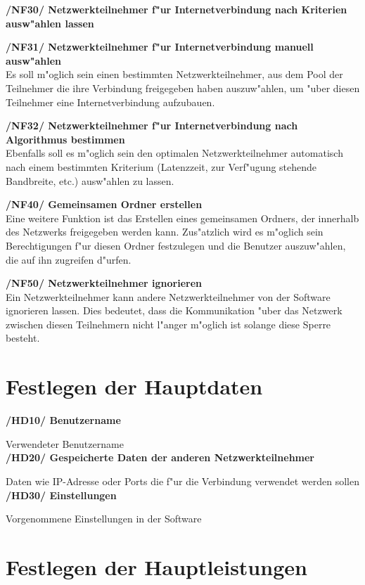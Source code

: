 \documentclass[a4paper,12pt]{scrreprt}
\begin{document}
	\textbf {/NF30/ Netzwerkteilnehmer f"ur Internetverbindung nach Kriterien ausw"ahlen lassen}
	
	\textbf {/NF31/ Netzwerkteilnehmer f"ur Internetverbindung manuell ausw"ahlen}
	\\Es soll m"oglich sein einen bestimmten Netzwerkteilnehmer, aus dem Pool der Teilnehmer die ihre Verbindung freigegeben haben auszuw"ahlen, um "uber diesen Teilnehmer eine Internetverbindung aufzubauen.
	
	\textbf {/NF32/ Netzwerkteilnehmer f"ur Internetverbindung nach Algorithmus bestimmen}
	\\Ebenfalls soll es m"oglich sein den optimalen Netzwerkteilnehmer automatisch nach einem bestimmten Kriterium (Latenzzeit, zur Verf"ugung stehende Bandbreite, etc.) ausw"ahlen zu lassen.
	
	\textbf {/NF40/ Gemeinsamen Ordner erstellen}
	\\Eine weitere Funktion ist das Erstellen eines gemeinsamen Ordners, der innerhalb des Netzwerks freigegeben werden kann. Zus"atzlich wird es m"oglich sein Berechtigungen f"ur diesen Ordner festzulegen und die Benutzer auszuw"ahlen, die auf ihn zugreifen d"urfen.
	
	\textbf {/NF50/ Netzwerkteilnehmer ignorieren}
	\\Ein Netzwerkteilnehmer kann andere Netzwerkteilnehmer von der Software ignorieren lassen. Dies bedeutet, dass die Kommunikation "uber das Netzwerk zwischen diesen Teilnehmern nicht l"anger m"oglich ist solange diese Sperre besteht.
	
	\section{Festlegen der Hauptdaten}
	\textbf {/HD10/ Benutzername}
	
	Verwendeter Benutzername\\
	\textbf {/HD20/ Gespeicherte Daten der anderen Netzwerkteilnehmer}
	
	Daten wie IP-Adresse oder Ports die f"ur die Verbindung verwendet werden sollen\\
	\textbf {/HD30/ Einstellungen}
	
	Vorgenommene Einstellungen in der Software\\
	
	
	\section{Festlegen der Hauptleistungen}
	
\end{document}
